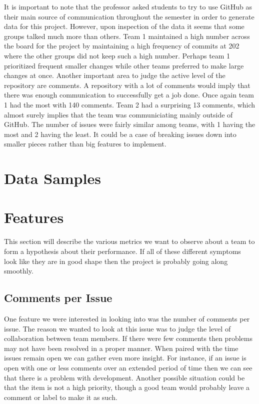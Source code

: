 \documentclass[conference]{IEEEtran}
\begin{document}
It is important to note that the professor asked students to try to use GitHub as their main source of communication throughout the semester in order to generate data for this project. However, upon inspection of the data it seems that some groups talked much more than others. Team 1 maintained a high number across the board for the project by maintaining a high frequency of commits at 202 where the other groups did not keep such a high number. Perhaps team 1 prioritized frequent smaller changes while other teams preferred to make large changes at once. Another important area to judge the active level of the repository are comments. A repository with a lot of comments would imply that there was enough communication to successfully get a job done. Once again team 1 had the most with 140 comments. Team 2 had a surprising 13 comments, which almost surely implies that the team was communiciating mainly outside of GitHub. The number of issues were fairly similar among teams, with 1 having the most and 2 having the least. It could be a case of breaking issues down into smaller pieces rather than big features to implement. 

\section{Data Samples}

\section{Features}
This section will describe the various metrics we want to observe about a team to form a hypothesis about their performance. If all of these different symptoms look like they are in good shape then the project is probably going along smoothly. 

\subsection{Comments per Issue}
One feature we were interested in looking into was the number of comments per issue. The reason we wanted to look at this issue was to judge the level of collaboration between team members. If there were few comments then problems may not have been resolved in a proper manner. When paired with the time issues remain open we can gather even more insight. For instance, if an issue is open with one or less comments over an extended period of time then we can see that there is a problem with development. Another possible situation could be that the item is not a high priority, though a good team would probably leave a comment or label to make it as such. 
\end{document}
